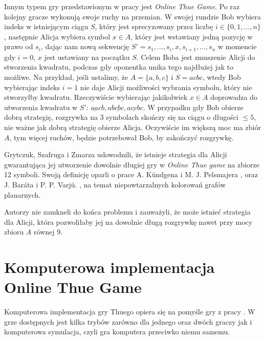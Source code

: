 \documentclass[document]{xmgr}
\begin{document}
Innym typem gry przedstawionym w pracy \cite{thueonline} jest \emph{Online Thue Game}. Po raz kolejny gracze wykonują swoje ruchy na przemian. W swojej rundzie Bob wybiera indeks w istniejącym ciągu $S$, który jest sprecyzowany przez liczbę $i \in \{0, 1, ..., n\}$, następnie Alicja wybiera symbol $x \in A$, który jest wstawiany jedną pozycję w prawo od $s_i$, dając nam nową sekwencję $S' = s_1, ..., s_i, x, s_{i+1}, ...,s_n$ w momencie gdy $i = 0$, $x$ jest ustawiany na początku $S$. Celem Boba jest zmuszenie Alicji do stworzenia kwadratu, podczas gdy oponentka unika tego najdłużej jak to możliwe. Na przykład, jeśli ustalimy, że $A = \{a, b, c\}$ i $S = acbc$, wtedy Bob wybierając indeks $i = 1$ nie daje Alicji możliwości wybrania symbolu, który nie stworzyłby kwadratu. Rzeczywiście wybierając jakikolwiek $x \in A$ doprowadza do utworzenia kwadratu w $S'$: $\underline{aa}cb, a\underline{bcbc}, a\underline{cc}bc$. W przypadku gdy Bob obierze dobrą strategię, rozgrywka na 3 symbolach skończy się na ciągu o długości $\leq 5$, nie ważne jak dobrą strategię obierze Alicja. Oczywiście im większą moc ma zbiór $A$, tym więcej ruchów, będzie potrzebował Bob, by zakończyć rozgrywkę. 

Grytczuk, Szafruga i Zmarza \cite{thueonline} udowodnili, że istnieje strategia dla Alicji gwarantująca jej utworzenie dowolnie długiej gry w \emph{Online Thue game} na zbiorze 12 symboli. Swoją definicję oparli o prace A. Kündgena i M. J. Pelsmajera \cite{first}, oraz J. Baráta i P. P. Varjú. \cite{second}, na temat niepowtarzalnych kolorowań grafów planarnych.

Autorzy \cite{thueonline} nie zamkneli do końca problemu i zauważyli, że może istnieć strategia dla Alicji, która pozwoliłaby jej na dowolnie długą rozgrywkę nawet przy mocy zbioru $A$ równej 9.


\section{Komputerowa implementacja Online Thue Game}

Komputerowa implementacja gry Thuego opiera się na pomyśle gry z pracy \cite{thueonline}. W grze dostępnych jest kilka trybów zarówno dla jednego oraz dwóch graczy jak i komputerowa symulacja, czyli gra komputera przeciwko niemu samemu.
\end{document}
